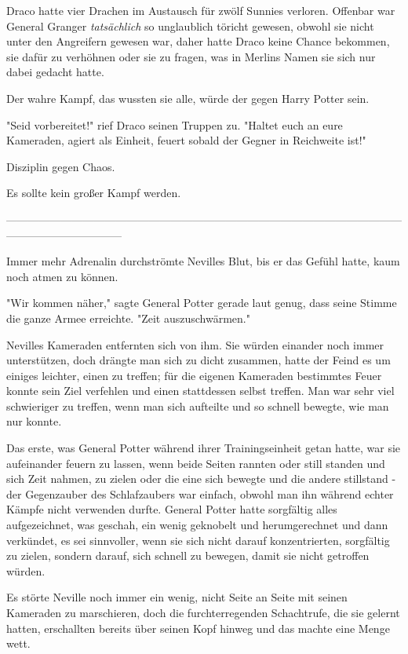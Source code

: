 {Draco hatte vier Drachen im Austausch für zwölf Sunnies verloren. Offenbar war General Granger \emph{tatsächlich} so unglaublich töricht gewesen, obwohl sie nicht unter den Angreifern gewesen war, daher hatte Draco keine Chance bekommen, sie dafür zu verhöhnen oder sie zu fragen, was in Merlins Namen sie sich nur dabei gedacht hatte.

Der wahre Kampf, das wussten sie alle, würde der gegen Harry Potter sein.

"Seid vorbereitet!" rief Draco seinen Truppen zu. "Haltet euch an eure Kameraden, agiert als Einheit, feuert sobald der Gegner in Reichweite ist!"

Disziplin gegen Chaos.

Es sollte kein großer Kampf werden.

--------------------------------------------------------------------------------------------------------------------------------------------

Immer mehr Adrenalin durchströmte Nevilles Blut, bis er das Gefühl hatte, kaum noch atmen zu können.

"Wir kommen näher," sagte General Potter gerade laut genug, dass seine Stimme die ganze Armee erreichte. "Zeit auszuschwärmen."

Nevilles Kameraden entfernten sich von ihm. Sie würden einander noch immer unterstützen, doch drängte man sich zu dicht zusammen, hatte der Feind es um einiges leichter, einen zu treffen; für die eigenen Kameraden bestimmtes Feuer konnte sein Ziel verfehlen und einen stattdessen selbst treffen. Man war sehr viel schwieriger zu treffen, wenn man sich aufteilte und so schnell bewegte, wie man nur konnte.

Das erste, was General Potter während ihrer Trainingseinheit getan hatte, war sie aufeinander feuern zu lassen, wenn beide Seiten rannten oder still standen und sich Zeit nahmen, zu zielen oder die eine sich bewegte und die andere stillstand - der Gegenzauber des Schlafzaubers war einfach, obwohl man ihn während echter Kämpfe nicht verwenden durfte. General Potter hatte sorgfältig alles aufgezeichnet, was geschah, ein wenig geknobelt und herumgerechnet und dann verkündet, es sei sinnvoller, wenn sie sich nicht darauf konzentrierten, sorgfältig zu zielen, sondern darauf, sich schnell zu bewegen, damit sie nicht getroffen würden.

Es störte Neville noch immer ein wenig, nicht Seite an Seite mit seinen Kameraden zu marschieren, doch die furchterregenden Schachtrufe, die sie gelernt hatten, erschallten bereits über seinen Kopf hinweg und das machte eine Menge wett.

}
